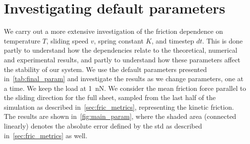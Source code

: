 \section{Investigating default parameters}\label{sec:main_params}
We carry out a more extensive investigation of the friction dependence on temperature $T$, sliding speed $v$, spring
constant $K$, and timestep $dt$. This is done partly to
understand how the dependencies relate to the theoretical, numerical and
experimental results, and partly to understand how these parameters affect
the stability of our system. We use the default parameters presented in~\cref{tab:final_param} and investigate the results as we change parameters, one at a time. We keep the load at \SI{1}{nN}. We consider the mean
friction force parallel to the sliding direction for the full sheet, sampled from the last half of the simulation as described in~\cref{sec:fric_metrics}, representing the kinetic friction. The results are shown in~\cref{fig:main_param}, where the shaded area (connected linearly) denotes the absolute error defined by the \acrshort{std} as described in~\cref{sec:fric_metrics} as well. 

